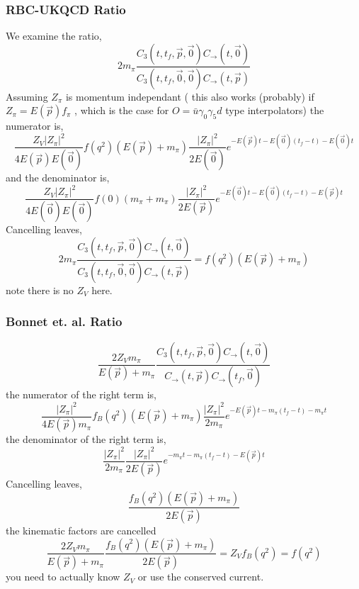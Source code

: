 \documentclass[3p,preprint]{elsarticle}
\begin{document}
\subsubsection{RBC-UKQCD Ratio}
We examine the ratio,
\begin{equation}
2 m_\pi \frac{ C_{3} (t, t_f, \vec{p}, \vec{0} )  C_{\rightarrow}(t, \vec{0}) }{ C_{3} (t, t_f, \vec{0}, \vec{0} )  C_{\rightarrow}(t, \vec{p}) }
\end{equation}
Assuming $Z_\pi$ is momentum independant ( this also works (probably) if $Z_\pi = E(\vec{p}) f_\pi$ , which is
the case for $O = \bar{u} \gamma_0 \gamma_5 d$ type interpolators) the numerator is,
\begin{equation}
\frac{ Z_V |Z_\pi|^2 }{ 4 E(\vec{p}) E(\vec{0})} f(q^2) ( E(\vec{p}) + m_\pi ) \frac{|Z_\pi|^2}{2 E(\vec{0})} e^{ -E(\vec{p})t - E(\vec{0})(t_f - t) -E(\vec{0})t }
\end{equation}
and the denominator is,
\begin{equation}
\frac{ Z_V |Z_\pi|^2 }{ 4 E(\vec{0}) E(\vec{0})} f(0) ( m_\pi + m_\pi ) \frac{|Z_\pi|^2}{2 E(\vec{p})} e^{ -E(\vec{0})t - E(\vec{0})(t_f - t) -E(\vec{p})t }
\end{equation}
Cancelling leaves,
\begin{equation}
2 m_\pi \frac{ C_{3} (t, t_f, \vec{p}, \vec{0} )  C_{\rightarrow}(t, \vec{0}) }{ C_{3} (t, t_f, \vec{0}, \vec{0} )  C_{\rightarrow}(t, \vec{p}) } = f(q^2) ( E(\vec{p}) + m_\pi ) 
\end{equation}
note there is no $Z_V$ here.

\subsubsection{Bonnet et. al. Ratio}

\begin{equation}
\frac{2 Z_V m_\pi}{E(\vec{p}) + m_\pi} \frac{ C_{3} (t, t_f, \vec{p}, \vec{0} )  C_{\rightarrow}(t, \vec{0}) }{ C_{\rightarrow} (t, \vec{p} )  C_{\rightarrow}(t_f, \vec{0}) }
\end{equation}
the numerator of the right term is,
\begin{equation}
\frac{ |Z_\pi|^2 }{ 4 E(\vec{p}) m_\pi} f_B(q^2) ( E(\vec{p}) + m_\pi ) \frac{|Z_\pi|^2}{2 m_\pi} e^{ -E(\vec{p})t - m_\pi(t_f - t) -m_\pi t }
\end{equation}
the denominator of the right term is,
\begin{equation}
\frac{ |Z_\pi|^2 }{ 2 m_\pi } \frac{|Z_\pi|^2}{2 E(\vec{p})} e^{ -m_\pi t - m_\pi (t_f - t) -E(\vec{p})t }
\end{equation}
Cancelling leaves,
\begin{equation}
\frac{ f_B(q^2) ( E(\vec{p}) + m_\pi ) }{ 2 E(\vec{p}) }
\end{equation}
the kinematic factors are cancelled 
\begin{equation}
\frac{2 Z_V m_\pi}{E(\vec{p}) + m_\pi} \frac{ f_B(q^2) ( E(\vec{p}) + m_\pi ) }{ 2 E(\vec{p}) } = Z_V f_B(q^2) = f(q^2) 
\end{equation}
you need to actually know $Z_V$ or use the conserved current.
\end{document}
